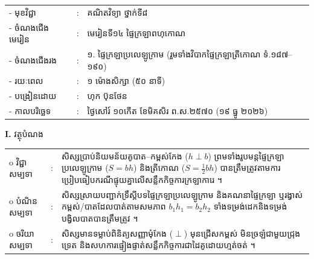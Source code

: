 \documentclass[a4paper,10pt]{article}
\newcommand{\wcirc}{{\CourierBullet\fontsize{9.5pt}{11pt}\selectfont o}}
\begin{document}
{\renewcommand{\arraystretch}{0.98}
\hspace*{4.05cm}%
\begin{tabular}{@{}l l l@{}}
  - \hspace{0.35cm} មុខវិជ្ជា & : & គណិតវិទ្យា ថ្នាក់ទី៨ \\
  - \hspace{0.35cm} ចំណងជើងមេរៀន & : & មេរៀនទី១៤ ផ្ទៃក្រឡាពហុកោណ \\
  - \hspace{0.35cm} ចំណងជើងរង & : & ១. ផ្ទៃក្រឡាប្រលេឡូក្រាម (រួមទាំងវិបាកផ្ទៃក្រឡាត្រីកោណ ទំ.១៨៧--១៩០) \\
  - \hspace{0.35cm} រយៈពេល & : & ១ ម៉ោងសិក្សា (៥០ នាទី) \\
  - \hspace{0.35cm} បង្រៀនដោយ & : & ហុក ប៊ុនថែន \\
  - \hspace{0.35cm} កាលបរិច្ឆេទ & : & ថ្ងៃសៅរ៍ ១០កើត ខែមិគសិរ ព.ស.២៥៧០ (១៩ ធ្នូ ២០២៦) \\
\end{tabular}

\vspace{2pt}

\textbf{I.} {\muol វត្ថុបំណង}\\[1pt]
\hspace*{0.55cm}%
\begin{tabular}{@{}l l L{14.2cm}@{}}
  \wcirc \hspace{0.25cm} វិជ្ជាសម្បទា & : & សិស្សប្រាប់និយមន័យគូបាត--កម្ពស់កែង ($h \perp b$) ព្រមទាំងរូបមន្តផ្ទៃក្រឡាប្រលេឡូក្រាម ($S = bh$) និងត្រីកោណ ($S = \frac{1}{2}bh$) បានត្រឹមត្រូវតាមការប្រៀបធៀបករណីផ្ទុយគ្នាលើសន្លឹកកិច្ចការក្រឡាការេ ។ \\
  \wcirc \hspace{0.25cm} បំណិនសម្បទា & : & សិស្សស្រាយបញ្ជាក់ទ្រឹស្តីបទផ្ទៃក្រឡាប្រលេឡូក្រាម និងគណនាផ្ទៃក្រឡា ឬរង្វាស់កម្ពស់/បាតដែលបាត់តាមសមភាព $b_1h_1 = b_2h_2$ ទាំងទម្រង់ដេកនិងទម្រង់បង្វិលបាតបានត្រឹមត្រូវ ។ \\
  \wcirc \hspace{0.25cm} ចរិយាសម្បទា & : & សិស្សមានទម្លាប់ពិនិត្យសញ្ញាមុំកែង ($\perp$) មុនជ្រើសកម្ពស់ មិនច្រឡំជាមួយជ្រុងទ្រេត និងសហការផ្ទៀងផ្ទាត់សន្លឹកកិច្ចការជាដៃគូដោយហ្មត់ចត់ ។ \\
\end{tabular}

\vspace{2pt}

}
\end{document}
